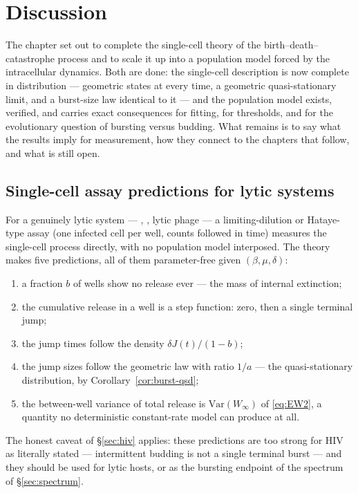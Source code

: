 
\section{Discussion}
\label{sec:discussion}

The chapter set out to complete the single-cell theory of the
birth--death--catastrophe process and to scale it up into a population
model forced by the intracellular dynamics. Both are done: the single-cell
description is now complete in distribution --- geometric states at every
time, a geometric quasi-stationary limit, and a burst-size law identical to
it --- and the population model exists, verified, and carries exact
consequences for fitting, for thresholds, and for the evolutionary question
of bursting versus budding. What remains is to say what the results imply
for measurement, how they connect to the chapters that follow, and what is
still open.

\subsection{Single-cell assay predictions for lytic systems}
\label{sec:discussion-assay}

For a genuinely lytic system --- \yp{}, \ft{}, lytic phage --- a
limiting-dilution or Hataye-type assay (one infected cell per well, counts
followed in time) measures the single-cell process directly, with no
population model interposed. The theory makes five predictions, all of them
parameter-free given $(\beta,\mu,\delta)$:
\begin{enumerate}
\item a fraction $b$ of wells show no release ever --- the mass of internal
extinction;
\item the cumulative release in a well is a step function: zero, then a
single terminal jump;
\item the jump times follow the density $\delta J(t)/(1-b)$;
\item the jump sizes follow the geometric law with ratio $1/a$ --- the
quasi-stationary distribution, by Corollary~\ref{cor:burst-qsd};
\item the between-well variance of total release is $\mathrm{Var}(W_\infty)$
of \eqref{eq:EW2}, a quantity no deterministic constant-rate model can
produce at all.
\end{enumerate}
The honest caveat of \S\ref{sec:hiv} applies: these predictions are too
strong for HIV as literally stated --- intermittent budding is not a single
terminal burst --- and they should be used for lytic hosts, or as the
bursting endpoint of the spectrum of \S\ref{sec:spectrum}.

